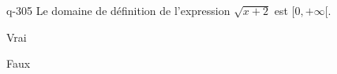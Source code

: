 \begin{truefalse}{q-305}
Le domaine de définition de l'expression $\sqrt{x+2}$ est $[0,+\infty[$.
\item Vrai
\item* Faux
\end{truefalse}

